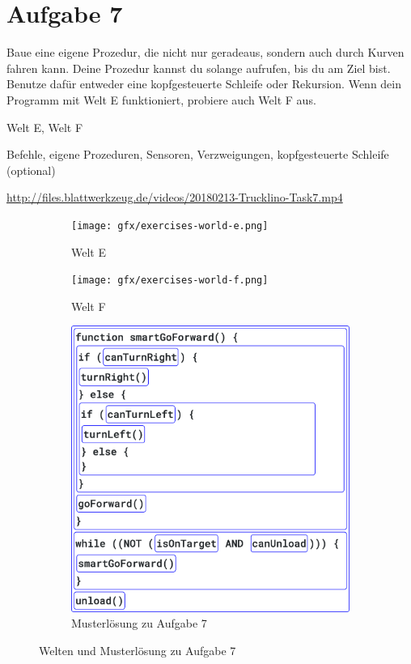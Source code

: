 \pagebreak

\section*{Aufgabe 7}
\label{sec:exercises:7}

Baue eine eigene Prozedur, die nicht nur geradeaus, sondern auch durch Kurven fahren kann. Deine Prozedur kannst du solange aufrufen, bis du am Ziel bist. Benutze dafür entweder eine kopfgesteuerte Schleife oder Rekursion. Wenn dein Programm mit Welt E funktioniert, probiere auch Welt F aus.

\begin{description}[noitemsep]
  \item[Welt wählen:] Welt E, Welt F
  \item[Du brauchst:] Befehle, eigene Prozeduren, Sensoren, Verzweigungen, kopfgesteuerte Schleife (optional)
  \item[Video:] \url{http://files.blattwerkzeug.de/videos/20180213-Trucklino-Task7.mp4}
\end{description}

\begin{figure}[H]
  \begin{subfigure}[b]{0.40\textwidth}
    \texttt{[image: gfx/exercises-world-e.png]}
    \caption{Welt E}
  \end{subfigure}\hfill
  \vspace{0.5cm}
  \begin{subfigure}[b]{0.40\textwidth}
    \texttt{[image: gfx/exercises-world-f.png]}
    \caption{Welt F}
  \end{subfigure}
  \vspace{0.5cm}
  \begin{subfigure}[b]{0.40\textwidth}
    \includegraphics[width=\textwidth]{gfx/exercises-program-7.png}
    \caption{Musterlösung zu Aufgabe 7}
  \end{subfigure}
  \caption{Welten und Musterlösung zu Aufgabe 7}
\end{figure}

